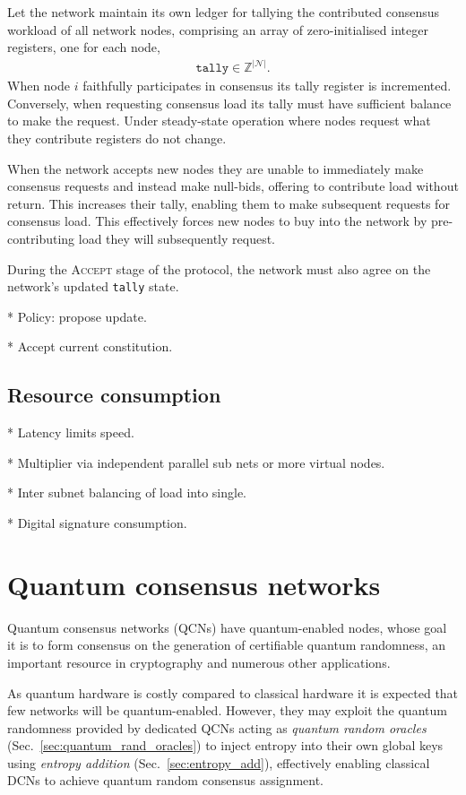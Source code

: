 \documentclass[twocolumn, aps, amsmath, amssymb, nofootinbib, superscriptaddress, longbibliography, floatfix, eqsecnum, rmp]{revtex4-2}
\begin{document}
Let the network maintain its own ledger for tallying the contributed consensus workload of all network nodes, comprising an array of zero-initialised integer registers, one for each node,
\begin{align}
	\mathtt{tally}\in\mathbb{Z}^{|\mathcal{N}|}.
\end{align}
When node $i$ faithfully participates in consensus its tally register is incremented. Conversely, when requesting consensus load its tally must have sufficient balance to make the request. Under steady-state operation where nodes request what they contribute registers do not change. 

When the network accepts new nodes they are unable to immediately make consensus requests and instead make null-bids, offering to contribute load without return. This increases their tally, enabling them to make subsequent requests for consensus load. This effectively forces new nodes to buy into the network by pre-contributing load they will subsequently request.

During the \textsc{Accept} stage of the protocol, the network must also agree on the network's updated \texttt{tally} state.

* Policy: propose update.

* Accept current constitution.



\subsection{Resource consumption}

* Latency limits speed.

* Multiplier via independent parallel sub nets or more virtual nodes.

* Inter subnet balancing of load into single.

* Digital signature consumption.

\section{Quantum consensus networks} \label{sec:QCN}

Quantum consensus networks (QCNs) have quantum-enabled nodes, whose goal it is to form consensus on the generation of certifiable quantum randomness, an important resource in cryptography and numerous other applications.

As quantum hardware is costly compared to classical hardware it is expected that few networks will be quantum-enabled. However, they may exploit the quantum randomness provided by dedicated QCNs acting as \emph{quantum random oracles} (Sec.~\ref{sec:quantum_rand_oracles}) to inject entropy into their own global keys using \emph{entropy addition} (Sec.~\ref{sec:entropy_add}), effectively enabling classical DCNs to achieve quantum random consensus assignment.
\end{document}
